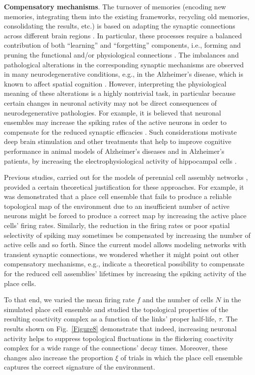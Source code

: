 \documentclass[12pt,tightenlines]{revtex4}
\begin{document}
\textbf{Compensatory mechanisms}. The turnover of memories (encoding new memories, integrating them into 
the existing frameworks, recycling old memories, consolidating the results, etc.) is based on adapting the synaptic 
connections across different brain regions \cite{OReilly}. In particular, these processes require a balanced contribution 
of both ``learning'' and ``forgetting'' components, i.e., forming and pruning the functional and/or physiological connections 
\cite{Kuhl, Murre}. The imbalances and pathological alterations in the corresponding synaptic mechanisms are observed in 
many neurodegenerative conditions, e.g., in the Alzheimer's disease, which is known to affect spatial cognition \cite{Selkoe}. 
However, interpreting the physiological meaning of these alterations is a highly nontrivial task, in particular because certain 
changes in neuronal activity may not be direct consequences of neurodegenerative pathologies.  For example, it is believed 
that neuronal ensembles may increase the spiking rates of the active neurons in order to compensate for the reduced synaptic 
efficacies \cite{Palop,Cacucci,Busche1,Busche2,Busche3,Minkeviciene,Siskova}. Such considerations motivate deep brain 
stimulation and other treatments that help to improve cognitive performance in animal models of Alzheimer's diseases and 
in Alzheimer's patients, by increasing the electrophysiological activity of hippocampal cells \cite{Laxton, Shirvalkar}.

Previous studies, carried out for the models of perennial cell assembly networks \cite{MB}, provided a certain theoretical 
justification for these approaches. For example, it was demonstrated that a place cell ensemble that fails to produce a reliable 
topological map of the environment due to an insufficient number of active neurons might be forced to produce a correct map 
by increasing the active place cells' firing rates. Similarly, the reduction in the firing rates or poor spatial selectivity of spiking 
may sometimes be compensated by increasing the number of active cells and so forth. Since the current model allows modeling 
networks with transient synaptic connections, we wondered whether it might point out other compensatory mechanisms, e.g., 
indicate a theoretical possibility to compensate for the reduced cell assemblies' lifetimes by increasing the spiking activity of the 
place cells. 

To that end, we varied the mean firing rate $f$ and the number of cells $N$ in the simulated place cell ensemble and 
studied the topological properties of the resulting coactivity complex as a function of the links' proper half-life, $\tau$. 
The results shown on Fig.~\ref{Figure8} demonstrate that indeed, increasing neuronal activity helps to suppress topological 
fluctuations in the flickering coactivity complex for a wide range of the connections' decay times. Moreover, these changes 
also increase the proportion $\xi$ of trials in which the place cell ensemble captures the correct signature of the environment.
\end{document}
